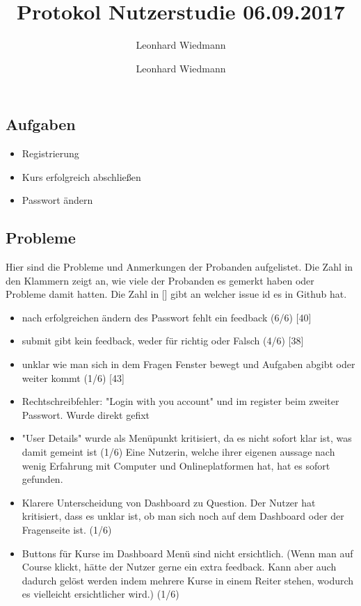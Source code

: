 \documentclass[colorback, accentcolor=tud1c, paper=a4]{tudexercise}
\title{Protokol Nutzerstudie 06.09.2017}
\subtitle{Leonhard Wiedmann}
\author{Leonhard Wiedmann}
\begin{document}
\maketitle
\subsection*{Aufgaben}
	\begin{itemize}
	\item Registrierung
  \item Kurs erfolgreich abschließen
  \item Passwort ändern
	\end{itemize}

\subsection*{Probleme}
  Hier sind die Probleme und Anmerkungen der Probanden aufgelistet. Die Zahl in den Klammern zeigt an, wie viele der Probanden es gemerkt haben oder Probleme damit hatten. Die Zahl in [] gibt an welcher issue id es in Github hat.
  \begin{itemize}
    \item nach erfolgreichen ändern des Passwort fehlt ein feedback (6/6) [40]
		\item submit gibt kein feedback, weder für richtig oder Falsch (4/6) [38]
		\item unklar wie man sich in dem Fragen Fenster bewegt und Aufgaben abgibt oder weiter kommt (1/6) [43]
		\item Rechtschreibfehler: "Login with you account" und im register beim zweiter Passwort. Wurde direkt gefixt
		\item "User Details" wurde als Menüpunkt kritisiert, da es nicht sofort klar ist, was damit gemeint ist (1/6) {Eine Nutzerin, welche ihrer eigenen aussage nach wenig Erfahrung mit Computer und Onlineplatformen hat, hat es sofort gefunden. }
		\item Klarere Unterscheidung von Dashboard zu Question. Der Nutzer hat kritisiert, dass es unklar ist, ob man sich noch auf dem Dashboard oder der Fragenseite ist. (1/6)
    \item Buttons für Kurse im Dashboard Menü sind nicht ersichtlich. (Wenn man auf Course klickt, hätte der Nutzer gerne ein extra feedback. Kann aber auch dadurch gelöst werden indem mehrere Kurse in einem Reiter stehen, wodurch es vielleicht ersichtlicher wird.) (1/6) 
   \end{itemize}
\end{document}
